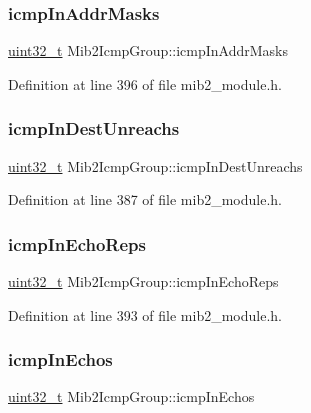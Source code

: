 \subsubsection{\texorpdfstring{icmp\+In\+Addr\+Masks}{icmpInAddrMasks}}
{\footnotesize\ttfamily \hyperlink{stdint_8h_a435d1572bf3f880d55459d9805097f62}{uint32\+\_\+t} Mib2\+Icmp\+Group\+::icmp\+In\+Addr\+Masks}



Definition at line 396 of file mib2\+\_\+module.\+h.

\mbox{\label{structMib2IcmpGroup_aad0c088ba22d28672d9a76a9fc991914}} 
\subsubsection{\texorpdfstring{icmp\+In\+Dest\+Unreachs}{icmpInDestUnreachs}}
{\footnotesize\ttfamily \hyperlink{stdint_8h_a435d1572bf3f880d55459d9805097f62}{uint32\+\_\+t} Mib2\+Icmp\+Group\+::icmp\+In\+Dest\+Unreachs}



Definition at line 387 of file mib2\+\_\+module.\+h.

\mbox{\label{structMib2IcmpGroup_a21a8ed8000fa93372a74cba337f9a027}} 
\subsubsection{\texorpdfstring{icmp\+In\+Echo\+Reps}{icmpInEchoReps}}
{\footnotesize\ttfamily \hyperlink{stdint_8h_a435d1572bf3f880d55459d9805097f62}{uint32\+\_\+t} Mib2\+Icmp\+Group\+::icmp\+In\+Echo\+Reps}



Definition at line 393 of file mib2\+\_\+module.\+h.

\mbox{\label{structMib2IcmpGroup_a4fdad4cb4032754d42d245d48a7e1f6f}} 
\subsubsection{\texorpdfstring{icmp\+In\+Echos}{icmpInEchos}}
{\footnotesize\ttfamily \hyperlink{stdint_8h_a435d1572bf3f880d55459d9805097f62}{uint32\+\_\+t} Mib2\+Icmp\+Group\+::icmp\+In\+Echos}




